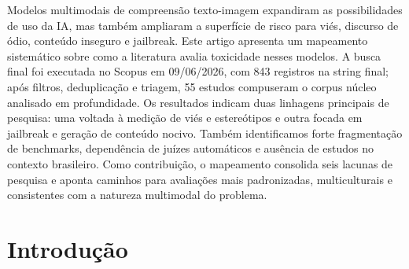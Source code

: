 \documentclass[12pt]{article}
\author{Julia Soares Dollis\inst{1}}
\begin{document}
\maketitle

\begin{abstract}
Modelos multimodais de compreensão texto-imagem ampliaram a capacidade de interação com conteúdo visual, mas também abriram novas superfícies de risco ligadas a viés, discurso de ódio, conteúdos inseguros e jailbreaks. Este artigo apresenta um mapeamento sistemático sobre como a literatura tem avaliado toxicidade nesses modelos. A busca final foi executada no Scopus em 09/06/2026 e retornou 843 registros; após filtros, deduplicação e triagem, 55 estudos compuseram o corpus núcleo analisado em profundidade. Os resultados mostram duas linhagens dominantes de pesquisa: avaliação de viés/estereótipos e avaliação de jailbreak/conteúdo nocivo. Também observamos forte fragmentação de benchmarks, dependência de juízes automáticos e baixa presença de estudos sobre contextos culturais e linguísticos fora do eixo anglófono. Por fim, o mapeamento consolida seis lacunas de pesquisa e indica direções para avaliações mais padronizadas, multiculturais e sensíveis ao contexto multimodal.
\end{abstract}

\begin{resumo}
Modelos multimodais de compreensão texto-imagem expandiram as possibilidades de uso da IA, mas também ampliaram a superfície de risco para viés, discurso de ódio, conteúdo inseguro e jailbreak. Este artigo apresenta um mapeamento sistemático sobre como a literatura avalia toxicidade nesses modelos. A busca final foi executada no Scopus em 09/06/2026, com 843 registros na string final; após filtros, deduplicação e triagem, 55 estudos compuseram o corpus núcleo analisado em profundidade. Os resultados indicam duas linhagens principais de pesquisa: uma voltada à medição de viés e estereótipos e outra focada em jailbreak e geração de conteúdo nocivo. Também identificamos forte fragmentação de benchmarks, dependência de juízes automáticos e ausência de estudos no contexto brasileiro. Como contribuição, o mapeamento consolida seis lacunas de pesquisa e aponta caminhos para avaliações mais padronizadas, multiculturais e consistentes com a natureza multimodal do problema.
\end{resumo}

\section{Introdução}
\end{document}
